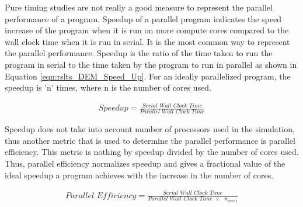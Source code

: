 \documentclass[preprint,11pt,authoryear]{elsarticle}
\begin{document}
Pure timing studies are not really a good measure to represent the parallel performance of a program. 
Speedup of a parallel program indicates the speed increase of the program when it is run on more 
compute cores compared to the wall clock time when it is run in serial. It is the most common way to 
represent the parallel performance. Speedup is the ratio of the time taken to run the program in serial 
to the time taken by the program to run in parallel as shown in Equation \ref{eqn:rslts_DEM_Speed_Up}. 
For an ideally parallelized program, the speedup is 'n' times, where n is the number of cores used.

\begin{align}
\textit{Speedup} = \frac{\textit{Serial Wall Clock Time}}{\textit{Parallel Wall Clock Time}}
\label{eqn:rslts_DEM_Speed_Up}
\end{align}

Speedup does not take into account number of processors used in the simulation, thus another metric 
that is used to determine the parallel performance is parallel efficiency. This metric is nothing by 
speedup divided by the number of cores used. Thus, parallel efficiency normalizes speedup and gives 
a fractional value of the ideal speedup a program achieves with the increase in the number of cores.

\begin{align}
\textit{Parallel Efficiency} = \frac{\textit{Serial Wall Clock Time}}{\textit{Parallel Wall Clock Time $\times$ $n_{cores}$}}
\label{eqn:rslts_DEM_parallel_efficiency}
\end{align}
\end{document}
